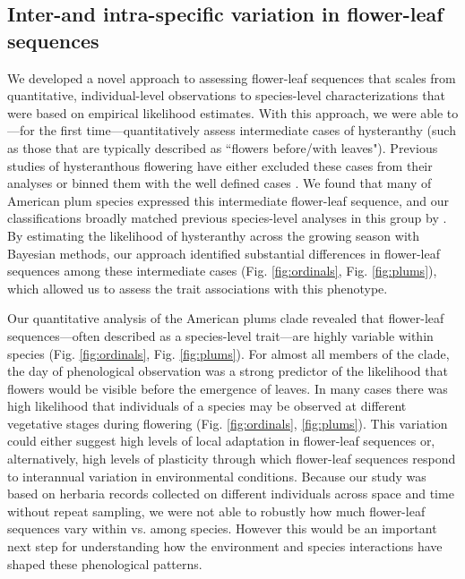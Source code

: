 \documentclass{article}[12pt]
\begin{document}
{\subsection*{Inter-and intra-specific variation in flower-leaf sequences} %
We developed a novel approach to assessing flower-leaf sequences that scales from quantitative, individual-level observations to species-level characterizations that were based on empirical likelihood estimates. With this approach, we were able to---for the first time---quantitatively assess intermediate cases of hysteranthy (such as those that are typically described as ``flowers before/with leaves"). Previous studies of hysteranthous flowering have either excluded these cases from their analyses  \citep[e.g.;][]{Gougherty2018} or binned them with the well defined cases \citep[e.g.;][]{Buonaiuto2020}. We found that many of American plum species expressed this intermediate flower-leaf sequence, and our classifications broadly matched previous species-level analyses in this group by \citet{Shaw:2004aa}. By estimating the likelihood of hysteranthy across the growing season with Bayesian methods, our approach identified substantial differences in flower-leaf sequences among these intermediate cases (Fig. \ref{fig:ordinals}, Fig. \ref{fig:plums}), which allowed us to assess the trait associations with this phenotype.

Our quantitative analysis of the American plums clade revealed that flower-leaf sequences---often described as a species-level trait---are highly variable within species (Fig. \ref{fig:ordinals}, Fig. \ref{fig:plums}). For almost all members of the clade, the day of phenological observation was a strong predictor of the likelihood that flowers would be visible before the emergence of leaves. In many cases there was high likelihood that individuals of a species may be observed at different vegetative stages during flowering (Fig. \ref{fig:ordinals}, \ref{fig:plums}). This variation could either suggest high levels of local adaptation in flower-leaf sequences or, alternatively, high levels of plasticity through which flower-leaf sequences respond to interannual variation in environmental conditions. Because our study was based on herbaria records collected on different individuals across space and time without repeat sampling, we were not able to robustly how much flower-leaf sequences vary within vs. among species. However this would be an important next step for understanding how the environment and species interactions have shaped these phenological patterns.

}
\end{document}
